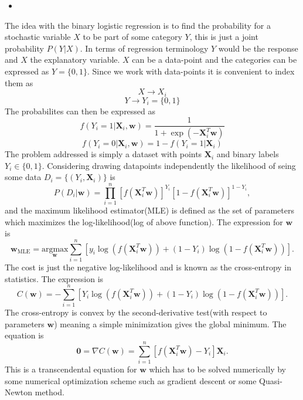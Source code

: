 \documentclass[11pt]{article}
\begin{document}
\newpage
\begin{itemize}
    \item 
\end{itemize}
    
    The idea with the binary logistic regression is to find the probability
for a stochastic variable \(X\) to be part of some category \(Y\), this
is just a joint probability \(P(Y|X)\). In terms of regression
terminology \(Y\) would be the response and \(X\) the explanatory
variable. \(X\) can be a data-point and the categories can be expressed
as \(Y=\{0,1\}\). Since we work with data-points it is convenient to
index them as \[X\rightarrow X_i\] \[Y\rightarrow Y_i=\{0,1\}\] The
probabilites can then be expressed as
\[f(Y_i=1|\boldsymbol{X}_i,\boldsymbol{w}) = \frac{1}{1 + \exp(-\boldsymbol{X}_i^T\boldsymbol{w})}\]
\[f(Y_i=0|\boldsymbol{X}_i,\boldsymbol{w}) = 1 - f(Y_i=1|\boldsymbol{X}_i)\]
The problem addressed is simply a dataset with points
\(\boldsymbol{X}_i\) and binary labels \(Y_i\in\{0,1\}\). Considering
drawing datapoints independently the likelihood of seing some data
\(D_i=\{(Y_i,\boldsymbol{X}_i)\}\) is
\[P(D_i|\boldsymbol{w}) = \prod_{i=1}^n\left[f\left(\boldsymbol{X}_i^T\boldsymbol{w}\right)\right]^{Y_i} \left[1 - f\left(\boldsymbol{X}_i^T\boldsymbol{w}\right)\right]^{1-Y_i},\]
and the maximum likelihood estimator(MLE) is defined as the set of
parameters which maximizes the log-likelihood(log of above function).
The expression for \(\boldsymbol{w}\) is
\[\boldsymbol{w}_{\text{MLE}}= \underset{\boldsymbol{w}}{\text{arg}\text{max}} \sum\limits_{i=1}^n \left[y_i\log\left(f\left(\boldsymbol{X}_i^T\boldsymbol{w}\right)\right) + (1 - Y_i)\log\left(1 - f\left(\boldsymbol{X}_i^T\boldsymbol{w}\right)\right)\right].\]
The cost is just the negative log-likelihood and is known as the
cross-entropy in statistics. The expression is
\[C(\boldsymbol{w}) = -\sum\limits_{i=1}^n \left[Y_i\log\left(f\left(\boldsymbol{X}_i^T\boldsymbol{w}\right)\right) + (1 - Y_i)\log\left(1 - f\left(\boldsymbol{X}_i^T\boldsymbol{w}\right)\right)\right].\]
The cross-entropy is convex by the second-derivative test(with respect
to parameters \(\boldsymbol{w}\)) meaning a simple minimization gives
the global minimum. The equation is
\[\boldsymbol{0} = \nabla C(\boldsymbol{w}) = \sum_{i=1}^n\left[f\left(\boldsymbol{X}_i^T\boldsymbol{w}\right) - Y_i\right]\boldsymbol{X}_i.\]
This is a transcendental equation for \(\boldsymbol{w}\) which has to be
solved numerically by some numerical optimization scheme such as
gradient descent or some Quasi-Newton method.
\end{document}
